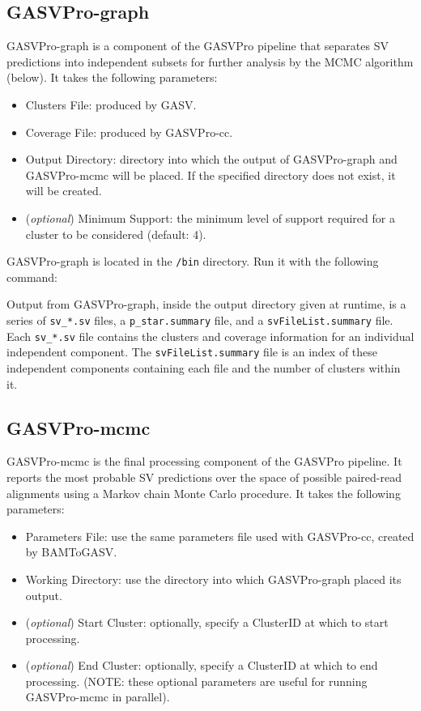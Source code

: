 \documentclass[11pt]{article}
\begin{document}
\subsection{GASVPro-graph}
GASVPro-graph is a component of the GASVPro pipeline that separates SV predictions into independent subsets for further analysis by the MCMC algorithm (below). It takes the following parameters:
\begin{itemize}
	\item Clusters File: produced by GASV. 
	\item Coverage File: produced by GASVPro-cc. 
	\item Output Directory: directory into which the output of GASVPro-graph and GASVPro-mcmc will be placed. If the specified directory does not exist, it will be created. 
	\item (\textit{optional}) Minimum Support: the minimum level of support required for a cluster to be considered (default: 4).
\end{itemize}

\noindent GASVPro-graph is located in the \verb+/bin+ directory. Run it with the following command:
\begin{framed}
\end{framed}

Output from GASVPro-graph, inside the output directory given at runtime, is a series of \verb+sv_*.sv+ files, a \verb+p_star.summary+ file, and a \verb+svFileList.summary+ file. Each \verb+sv_*.sv+ file contains the clusters and coverage information for an individual independent component. The \verb+svFileList.summary+ file is an index of these independent components containing each file and the number of clusters within it.

\subsection{GASVPro-mcmc}
GASVPro-mcmc is the final processing component of the GASVPro pipeline. It reports the most probable SV predictions over the space of possible paired-read alignments using a Markov chain Monte Carlo procedure. It takes the following parameters:
\begin{itemize}
	\item Parameters File: use the same parameters file used with GASVPro-cc, created by BAMToGASV.
	\item Working Directory: use the directory into which GASVPro-graph placed its output.
	\item ({\em optional}) Start Cluster: optionally, specify a ClusterID at which to start processing.
	\item ({\em optional}) End Cluster: optionally, specify a ClusterID at which to end processing. ({\small NOTE: these optional parameters are useful for running GASVPro-mcmc in parallel}).
\end{itemize}
\end{document}
